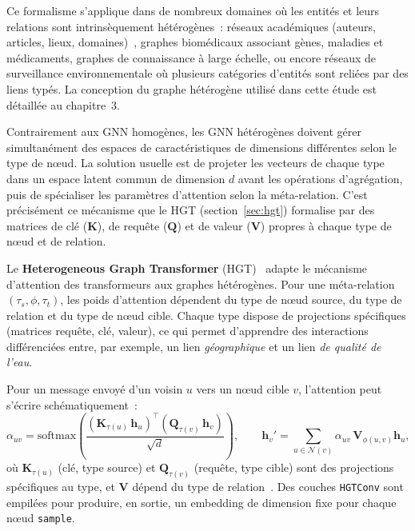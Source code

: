Ce formalisme s'applique dans de nombreux domaines o\`u les entit\'es et leurs relations sont intrins\`equement h\'et\'erog\`enes~: r\'eseaux acad\'emiques (auteurs, articles, lieux, domaines)~\cite{hu2020hgt}, graphes biom\'edicaux associant g\`enes, maladies et m\'edicaments, graphes de connaissance \`a large \'echelle, ou encore r\'eseaux de surveillance environnementale o\`u plusieurs cat\'egories d'entit\'es sont reli\'ees par des liens typ\'es.
La conception du graphe h\'et\'erog\`ene utilis\'e dans cette \'etude est d\'etaill\'ee au chapitre~3.

Contrairement aux GNN homog\`enes, les GNN h\'et\'erog\`enes doivent g\'erer simultan\'ement des espaces de caract\'eristiques de dimensions diff\'erentes selon le type de n\oe ud.
La solution usuelle est de projeter les vecteurs de chaque type dans un espace latent commun de dimension $d$ avant les op\'erations d'agr\'egation, puis de sp\'ecialiser les param\`etres d'attention selon la m\'eta-relation.
C'est pr\'ecis\'ement ce m\'ecanisme que le HGT (section~\ref{sec:hgt}) formalise par des matrices de cl\'e ($\mathbf{K}$), de requ\^ete ($\mathbf{Q}$) et de valeur ($\mathbf{V}$) propres \`a chaque type de n\oe ud et de relation.


\label{sec:hgt}

Le \textbf{Heterogeneous Graph Transformer} (HGT)~\cite{hu2020hgt} adapte le m\'ecanisme d'attention des transformeurs aux graphes h\'et\'erog\`enes.
Pour une m\'eta-relation $(\tau_s, \phi, \tau_t)$, les poids d'attention d\'ependent du type de n\oe ud source, du type de relation et du type de n\oe ud cible.
Chaque type dispose de projections sp\'ecifiques (matrices requ\^ete, cl\'e, valeur), ce qui permet d'apprendre des interactions diff\'erenci\'ees entre, par exemple, un lien \emph{g\'eographique} et un lien \emph{de qualit\'e de l'eau}.

Pour un message envoy\'e d'un voisin $u$ vers un n\oe ud cible $v$, l'attention peut s'\'ecrire sch\'ematiquement~:
\[
\alpha_{uv} = \mathrm{softmax}\!\left(\frac{(\mathbf{K}_{\tau(u)}\,\mathbf{h}_u)^{\top}(\mathbf{Q}_{\tau(v)}\,\mathbf{h}_v)}{\sqrt{d}}\right),
\qquad
\mathbf{h}_v' = \sum_{u \in \mathcal{N}(v)} \alpha_{uv}\, \mathbf{V}_{\phi(u,v)} \mathbf{h}_u,
\]
o\`u $\mathbf{K}_{\tau(u)}$ (cl\'e, type source) et $\mathbf{Q}_{\tau(v)}$ (requ\^ete, type cible) sont des projections sp\'ecifiques au type, et $\mathbf{V}$ d\'epend du type de relation~\cite{hu2020hgt}.
Des couches \texttt{HGTConv} sont empil\'ees pour produire, en sortie, un embedding de dimension fixe pour chaque n\oe ud \texttt{sample}.

